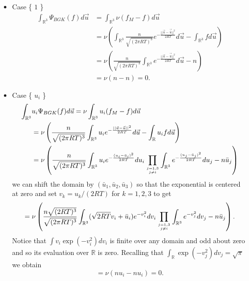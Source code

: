 %
\begin{itemize}
\item Case \{ $1$ \}
%
\begin{align*}
\int_{\mathbb{R}^3} \Psi_{BGK} (f) d\vec{u} &= \int_{\mathbb{R}^3} \nu (f_M - f) d\vec{u}\\
&= \nu \left(\int_{\mathbb{R}^3} \frac{n}{\sqrt{(2 \pi R T)^3}} e^{-\frac{||\vec{u} - \vec{\bar{u}}||^2}{2 R T}} d\vec{u} - \int_{\mathbb{R}^3} f d\vec{u} \right)\nonumber \\
&= \nu \left( \frac{n}{\sqrt{(2 \pi R T)^3}} \int_{\mathbb{R}^3} e^{-\frac{||\vec{u} - \vec{\bar{u}}||^2}{2 R T}} d\vec{u} - n \right)\nonumber \\
&= \nu (n - n) = 0.
\end{align*}
\item Case \{ $u_i$ \}
%
\begin{align*}
\int_{\mathbb{R}^3} &u_i \Psi_{BGK} (f) d\vec{u} = \nu \int_{\mathbb{R}^3} u_i (f_M - f) d\vec{u} \nonumber \\
&= \nu \left( \frac{n}{\sqrt{(2 \pi R T)^3}} \int_{\mathbb{R}^3} u_i e^{-\frac{||\vec{u} - \vec{\bar{u}}||^2}{2 R T}} d\vec{u} - \int_{\mathbb{R}} u_i f d\vec{u} \right)\nonumber \\
&= \nu \left( \frac{n}{\sqrt{(2 \pi R T)^3}} \int_{\mathbb{R}^3} u_i e^{-\frac{(u_i - \bar{u}_i)^2}{2 R T}} du_i \prod_{j=1,3 \atop j \ne i} \int_{\mathbb{R}^3} e^{-\frac{(u_j - \bar{u}_j)^2}{2 R T}} du_j - n \bar{u}_j \right) \nonumber
\end{align*}
%
we can shift the domain by $(\bar{u}_1,\bar{u}_2,\bar{u}_3)$ so that the exponential is centered at zero and set $v_k = u_k/(2 R T)$ for $k=1,2,3$ to get
%
\begin{align*}
= \nu \left( \frac{n \sqrt{(2 R T)^3}}{\sqrt{(2 \pi R T)^3}} \int_{\mathbb{R}^3} (\sqrt{2 R T} v_i + \bar{u}_i) e^{-v_i^2} dv_i \prod_{j=1,3 \atop j \ne i} \int_{\mathbb{R}^3} e^{-v_j^2} dv_j - n \bar{u}_j \right).
\end{align*}
%
Notice that $\int v_i  \exp{\left(-v_i^2\right)} d v_i$ is finite over any domain and odd about zero and so its evaluation over $\mathbb{R}$ is zero. Recalling that $\int_{\mathbb{R}}  \exp{\left(-v_j^2\right)} dv_j = \sqrt{\pi}$ we obtain
%
\begin{equation*}
= \nu (n u_i - n u_i) = 0.
\end{equation*}

\end{itemize}
